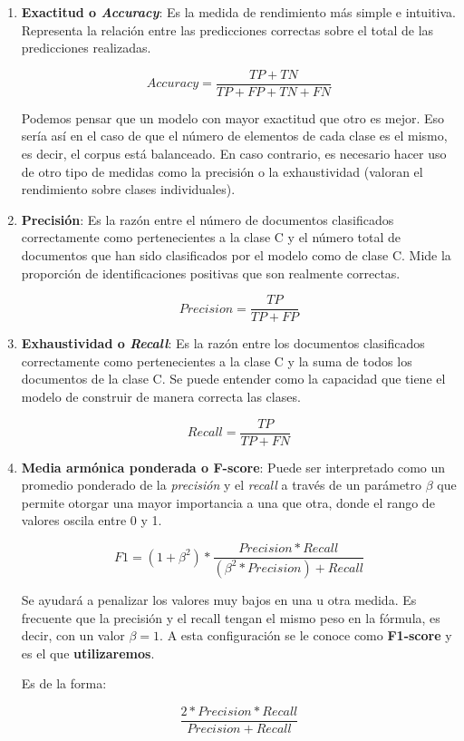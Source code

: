 \documentclass[a4paper,12pt]{report}
\begin{document}
\begin{enumerate}

\item \textbf{Exactitud o \textit{Accuracy}}: Es la medida de rendimiento más simple e intuitiva. Representa la relación entre las predicciones correctas sobre el total de las predicciones realizadas. 

\[  Accuracy = \frac{TP + TN}{TP + FP + TN + FN} \]

\vspace{4mm}
Podemos pensar que un modelo con mayor exactitud que otro es mejor. Eso sería así en el caso de que el número de elementos de cada clase es el mismo, es decir, el corpus está balanceado. En caso contrario, es necesario hacer uso de otro tipo de medidas como la precisión o la exhaustividad (valoran el rendimiento sobre clases individuales). 

\vspace{4mm}
\item \textbf{Precisión}: Es la razón entre el número de documentos clasificados correctamente como pertenecientes a la clase C y el número total de documentos que han sido clasificados por el modelo como de clase C. Mide la proporción de identificaciones positivas que son realmente correctas.

\[ Precision = \frac{TP}{TP + FP} \]

\vspace{4mm}
\item \textbf{Exhaustividad o \textit{Recall}}: Es la razón entre los documentos clasificados correctamente como pertenecientes a la clase C y la suma de todos los documentos de la clase C. Se puede entender como la capacidad que tiene el modelo de construir de manera correcta las clases.

\[ Recall = \frac{TP}{TP + FN} \]

\vspace{4mm}
\item \textbf{Media armónica ponderada o F-score}: Puede ser interpretado como un promedio ponderado de la \textit{precisión} y el \textit{recall} a través de un parámetro $\beta$ que permite otorgar una mayor importancia a una que otra, donde el rango de valores oscila entre 0 y 1. 

\[ F1 = (1 + \beta^{2})*  \frac{Precision * Recall}{(\beta^{2}*Precision) + Recall} \]

\vspace{4mm}
Se ayudará a penalizar los valores muy bajos en una u otra medida. Es frecuente que la precisión y el recall tengan el mismo peso en la fórmula, es decir, con un valor $\beta = 1$. A esta configuración se le conoce como \textbf{F1-score} y es el que \textbf{utilizaremos}.

\clearpage

Es de la forma:

\[ \frac{2*Precision*Recall}{Precision + Recall} \]
\vspace{4mm}
\end{enumerate}
\end{document}

